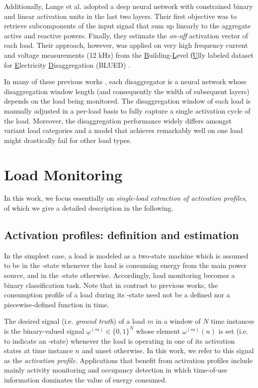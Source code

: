 \documentclass[twocolumn,letter,10pt]{IEEEtran} %
\begin{document}
Additionally, Lange et al. \cite{Lange_2016_BOLT} adopted a deep neural network with constrained binary and linear activation units in the last two layers. Their first objective was to retrieve subcomponents of the input signal that sum up linearly to the aggregate active and reactive powers. Finally, they estimate the \emph{on-off} activation vector of each load. Their approach, however, was applied on very high frequency current and voltage measurements (12 kHz) from the \underline{B}uilding-\underline{L}evel f\underline{U}lly labeled dataset for \underline{E}lectricity \underline{D}isaggregation (BLUED) \cite{Anderson_2012_BLUED}.

In many of these previous works \cite{Kelly_2015, He_2016_AnEmpiricalStudy, Zhang_2016_SequenceToPointLearning, Nascimento_2016}, each disaggregator is a neural network whose disaggregation window length (and consequently the width of subsequent layers) depends on the load being monitored. The disaggregation window of each load is manually adjusted in a per-load basis to fully capture a single activation cycle of the load. Moreover, the disaggregation performance widely differs amongst variant load categories and a model that achieves remarkably well on one load might drastically fail for other load types.



\section{Load Monitoring}
\label{sec:load-monitoring}

In this work, we focus essentially on \emph{single-load extraction of activation profiles}, of which we give a detailed description in the following.

\subsection{Activation profiles: definition and estimation}

In the simplest case, a load is modeled as a two-state machine which is assumed to be in the \on-state whenever the load is consuming energy from the main power source, and in the \off-state otherwise. Accordingly, load monitoring becomes a binary classification task.
Note that in contrast to previous works, the consumption profile of a load during its \on-state need not be a defined \cite{Zeifman_2011_VAST} nor a piecewise-defined function in time.

The desired signal (i.e. \emph{ground truth}) of a load $m$ in a window of $N$ time instances is the binary-valued signal $\underline{\omega}^{(m)}\in \{0, 1\}^N$ whose element $\omega^{(m)}(n)$ is set (i.e. to indicate an \on-state) whenever the load is operating in one of its activation states at time instance $n$ and unset otherwise. In this work, we refer to this signal as the \emph{activation profile}.
Applications that benefit from activation profiles include mainly activity monitoring and occupancy detection %
in which time-of-use information dominates the value of energy consumed.
\end{document}
